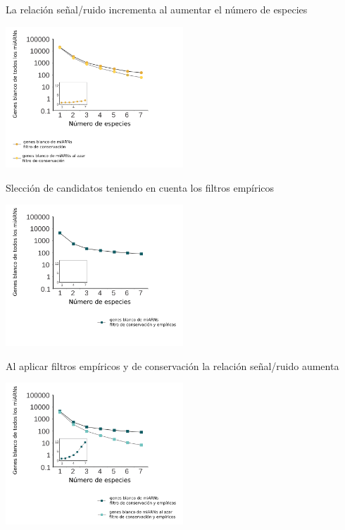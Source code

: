 \documentclass{beamer}
\begin{document}
\begin{frame}{La relación señal/ruido incrementa al aumentar el número de especies}
	\begin{center}
		\includegraphics[width=0.5\textwidth]{img/NAR_fig2_02.png}
	\end{center}
\end{frame}

\begin{frame}{Slección de candidatos teniendo en cuenta los filtros empíricos}
	\begin{center}
		\includegraphics[width=0.5\textwidth]{img/NAR_fig2_03.png}
	\end{center}
\end{frame}

\begin{frame}{Al aplicar filtros empíricos y de conservación la relación señal/ruido aumenta}
	\begin{center}
		\includegraphics[width=0.5\textwidth]{img/NAR_fig2_04.png}
	\end{center}
\end{frame}
\end{document}

